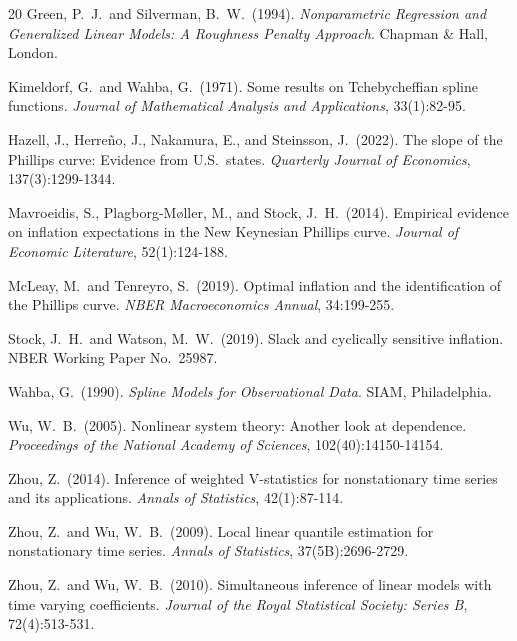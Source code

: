 \documentclass[12pt]{article}
\begin{document}
\begin{thebibliography}{20}
Green, P.~J.\ and Silverman, B.~W.\ (1994).
\newblock \emph{Nonparametric Regression and Generalized Linear Models: A Roughness Penalty Approach}.
\newblock Chapman \& Hall, London.

Kimeldorf, G.\ and Wahba, G.\ (1971).
\newblock Some results on {T}chebycheffian spline functions.
\newblock \emph{Journal of Mathematical Analysis and Applications}, 33(1):82-95.

Hazell, J., Herre\~{n}o, J., Nakamura, E., and Steinsson, J.\ (2022).
\newblock The slope of the {P}hillips curve: {E}vidence from {U.S.}\ states.
\newblock \emph{Quarterly Journal of Economics}, 137(3):1299-1344.

Mavroeidis, S., Plagborg-M{\o}ller, M., and Stock, J.~H.\ (2014).
\newblock Empirical evidence on inflation expectations in the {N}ew {K}eynesian {P}hillips curve.
\newblock \emph{Journal of Economic Literature}, 52(1):124-188.

McLeay, M.\ and Tenreyro, S.\ (2019).
\newblock Optimal inflation and the identification of the {P}hillips curve.
\newblock \emph{NBER Macroeconomics Annual}, 34:199-255.

Stock, J.~H.\ and Watson, M.~W.\ (2019).
\newblock Slack and cyclically sensitive inflation.
\newblock NBER Working Paper No.\ 25987.

Wahba, G.\ (1990).
\newblock \emph{Spline Models for Observational Data}.
\newblock SIAM, Philadelphia.

Wu, W.~B.\ (2005).
\newblock Nonlinear system theory: Another look at dependence.
\newblock \emph{Proceedings of the National Academy of Sciences}, 102(40):14150-14154.

Zhou, Z.\ (2014).
\newblock Inference of weighted V-statistics for nonstationary time series and its applications.
\newblock \emph{Annals of Statistics}, 42(1):87-114.

Zhou, Z.\ and Wu, W.~B.\ (2009).
\newblock Local linear quantile estimation for nonstationary time series.
\newblock \emph{Annals of Statistics}, 37(5B):2696-2729.

Zhou, Z.\ and Wu, W.~B.\ (2010).
\newblock Simultaneous inference of linear models with time varying coefficients.
\newblock \emph{Journal of the Royal Statistical Society: Series B}, 72(4):513-531.

\end{thebibliography}
\end{document}
